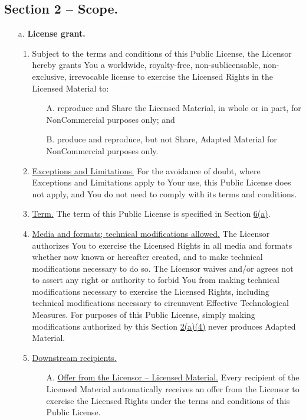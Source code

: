 \subsection*{Section 2 – Scope.}
\begin{itemize}
\item[a.] \textbf{License grant.}
	\begin{enumerate}
	\item Subject to the terms and conditions of this Public License, the Licensor hereby grants You a worldwide, royalty-free, non-sublicensable, non-exclusive, irrevocable license to exercise the Licensed Rights in the Licensed Material to:
	\begin{enumerate}
		\item[A.] reproduce and Share the Licensed Material, in whole or in part, for NonCommercial purposes only; and
		\item[B.] produce and reproduce, but not Share, Adapted Material for NonCommercial purposes only.
	\end{enumerate}
	\item \underline{Exceptions and Limitations.} For the avoidance of doubt, where Exceptions and Limitations apply to Your use, this Public License does not apply, and You do not need to comply with its terms and conditions.
	\item \underline{Term.} The term of this Public License is specified in Section \href{https://creativecommons.org/licenses/by-nc-nd/4.0/legalcode#s6a}{6(a)}.
	\item \underline{Media and formats; technical modifications allowed.} The Licensor authorizes You to exercise the Licensed Rights in all media and formats whether now known or hereafter created, and to make technical modifications necessary to do so. The Licensor waives and/or agrees not to assert any right or authority to forbid You from making technical modifications necessary to exercise the Licensed Rights, including technical modifications necessary to circumvent Effective Technological Measures. For purposes of this Public License, simply making modifications authorized by this Section \href{https://creativecommons.org/licenses/by-nc-nd/4.0/legalcode#s2a4}{2(a)(4)} never produces Adapted Material.
	\item \underline{Downstream recipients.}
		\begin{enumerate}
		\item[A.] \underline{Offer from the Licensor – Licensed Material.} Every recipient of the Licensed Material automatically receives an offer from the Licensor to exercise the Licensed Rights under the terms and conditions of this Public License.

\end{enumerate}
\end{enumerate}
\end{itemize}

